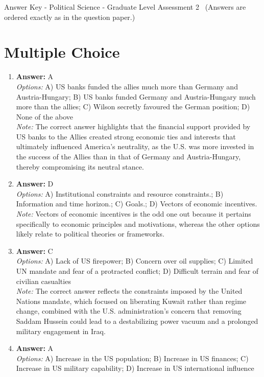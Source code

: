 \documentclass[12pt]{article}
\begin{document}
\begin{center}
Answer Key - Political Science - Graduate Level Assessment 2 \
\small (Answers are ordered exactly as in the question paper.)
\end{center}

\section*{Multiple Choice}
\begin{enumerate}[label=\arabic*.]
\item \textbf{Answer:} A
\\ \textit{Options:} A) US banks funded the allies much more than Germany and Austria-Hungary; B) US banks funded Germany and Austria-Hungary much more than the allies; C) Wilson secretly favoured the German position; D) None of the above
\\ \textit{Note:} The correct answer highlights that the financial support provided by US banks to the Allies created strong economic ties and interests that ultimately influenced America's neutrality, as the U.S. was more invested in the success of the Allies than in that of Germany and Austria-Hungary, thereby compromising its neutral stance.
\item \textbf{Answer:} D
\\ \textit{Options:} A) Institutional constraints and resource constraints.; B) Information and time horizon.; C) Goals.; D) Vectors of economic incentives.
\\ \textit{Note:} Vectors of economic incentives is the odd one out because it pertains specifically to economic principles and motivations, whereas the other options likely relate to political theories or frameworks.
\item \textbf{Answer:} C
\\ \textit{Options:} A) Lack of US firepower; B) Concern over oil supplies; C) Limited UN mandate and fear of a protracted conflict; D) Difficult terrain and fear of civilian casualties
\\ \textit{Note:} The correct answer reflects the constraints imposed by the United Nations mandate, which focused on liberating Kuwait rather than regime change, combined with the U.S. administration's concern that removing Saddam Hussein could lead to a destabilizing power vacuum and a prolonged military engagement in Iraq.
\item \textbf{Answer:} A
\\ \textit{Options:} A) Increase in the US population; B) Increase in US finances; C) Increase in US military capability; D) Increase in US international influence

\end{enumerate}
\end{document}
